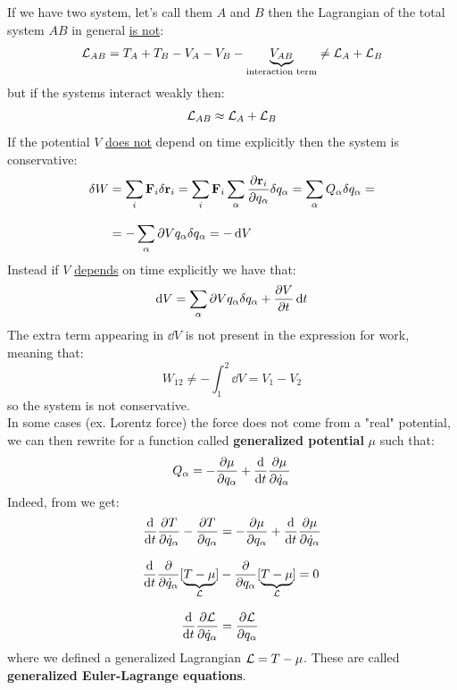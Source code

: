 If we have two system, let's call them $A$ and $B$ then the Lagrangian of the total system $AB$ in general \underline{is not}:
\begin{equation}
    \mathcal{L}_{AB} = T_A + T_B - V_A - V_B - \underbrace{V_{AB}}_{\text{interaction term}}\neq \mathcal{L}_A + \mathcal{L}_B
\end{equation}
but if the systems interact weakly then:
\begin{equation}
    \mathcal{L}_{AB} \approx \mathcal{L}_A + \mathcal{L}_B
\end{equation}
If the potential $V$ \underline{does not} depend on time explicitly then the system is conservative:
\begin{equation}
    \begin{split}
      \delta W &= \displaystyle\sum_i \vb{F}_i \delta \vb{r}_i = \displaystyle\sum_i \vb{F}_i \displaystyle\sum_{\alpha}\dfrac{\partial \vb{r}_i}{\partial q_{\alpha}}\delta q_{\alpha} = \displaystyle\sum_{\alpha} Q_{\alpha}\delta q_{\alpha} = \\[8pt]
      &= -\displaystyle\sum_{\alpha} \partial{V}{q_{\alpha}}\delta q_{\alpha} = -\dd{V}
    \end{split}
\end{equation}
Instead if $V$ \underline{depends} on time explicitly we have that:
\begin{equation}
    \dd{V} = \displaystyle\sum_{\alpha} \partial{V}{q_{\alpha}}\delta q_{\alpha} + \dfrac{\partial V}{\partial t}\dd{t}
\end{equation}
The extra term appearing in $\dd{V}$ is not present in the expression for work, meaning that:
\begin{equation}
    W_{12} \neq -\int_{1}^{2}\dd{V} = V_1 - V_2
\end{equation}
so the system is not conservative.\\
In some cases (ex. Lorentz force) the force does not come from a "real" potential, we can then rewrite \eleref\;for a function called \textbf{generalized potential} $\mu$ such that:
\begin{equation}
    Q_{\alpha} = -\dfrac{\partial \mu}{\partial q_{\alpha}} +\dv{}{t}\dfrac{\partial \mu}{\partial \dot{q}_{\alpha}}
\end{equation}
Indeed, from \lagrangeref\;we get:
\begin{equation}
    \begin{split}
      \dv{}{t}\dfrac{\partial T}{\partial \dot{q}_{\alpha}} - \dfrac{\partial T}{\partial q_{\alpha}} &= -\dfrac{\partial \mu}{\partial q_{\alpha}} +\dv{}{t}\dfrac{\partial \mu}{\partial \dot{q}_{\alpha}} \\[8pt]
      \dv{}{t}\dfrac{\partial }{\partial \dot{q}_{\alpha}}[\underbrace{T-\mu}_{\lagr}] &- \dfrac{\partial}{\partial q_{\alpha}}[\underbrace{T-\mu}_{\lagr}] = 0 \\[8pt]
      \dv{}{t}\pdv{\lagr}{\dot{q}_{\alpha}} &= \pdv{\lagr}{q_{\alpha}}
    \end{split}
\end{equation}
where we defined a generalized Lagrangian $\mathcal{L} = T-\mu$. These are called \textbf{generalized Euler-Lagrange equations}.
